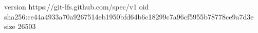 version https://git-lfs.github.com/spec/v1
oid sha256:ce44a4933a70a9267514eb1950bfd64b6c18299c7a96cf5955b78778ce9a7d3e
size 26503
